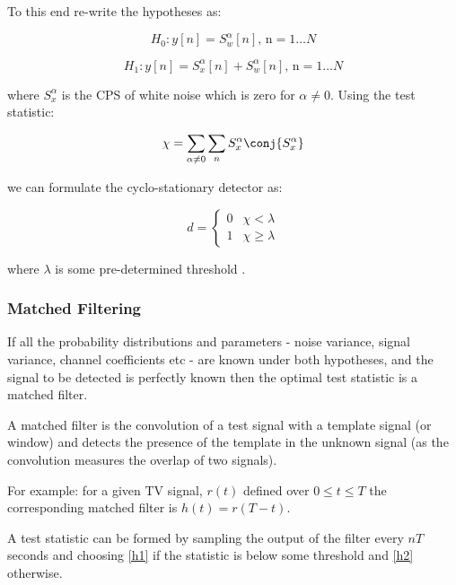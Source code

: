 To this end re-write the hypotheses as:

\begin{equation}
H_{0}: y\left[n\right] = S_{w}^\alpha \left[n\right] \text{, n} =  1 \ldots N 
\end{equation}
\label{c1}

\begin{equation}
H_{1}: y\left[n \right] = S_{x}^{\alpha} \left[n\right] + S_{w}^{\alpha} \left[n\right] \text{, n} =  1 \ldots N 
\end{equation}
\label{c2}

where \(S_{x}^{\alpha}\) is the CPS of white noise which is zero for \(\alpha \neq 0 \).  Using the test statistic:

\begin{equation}
\chi = \sum_{\alpha \neq 0} \sum_{n} S_{x}^{\alpha} \conj{S_{x}^{\alpha}}
\end{equation}

we can formulate the cyclo-stationary detector as:

\begin{equation}
 d =
  \begin{cases}
   0 & \chi < \lambda  \\
   1 & \chi \geq \lambda
  \end{cases}
\end{equation}

where \(\lambda\) is some pre-determined threshold \cite{Ghozzi2006}. 

\subsubsection{Matched Filtering}
If all the probability distributions and parameters  - noise variance, signal variance, channel coefficients etc - are known under both hypotheses, and the signal to be detected is perfectly known then the optimal test statistic is a matched filter.

A matched filter is the convolution of a test signal with a template signal (or window) and detects the presence of the template in the unknown signal (as the convolution measures the overlap of two signals).

For example: for a given TV signal, \(r\left(t\right)\) defined over \(0 \leq t \leq T\) the corresponding matched filter is \(h\left(t\right) = r\left(T - t\right)\). 

A test statistic can be formed by sampling the output of the filter every \(nT\) seconds and choosing \ref{h1} if the statistic is below some threshold and \ref{h2} otherwise.

